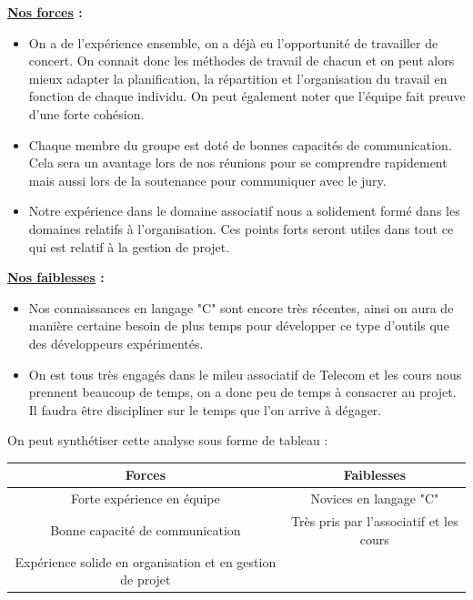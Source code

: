 \documentclass[a4paper, 12pt]{report}
\begin{document}
\textbf{\underline{Nos forces} :}
\begin{itemize}
    \item On a de l’expérience ensemble, on a déjà eu l'opportunité de travailler de concert. On connait donc les méthodes de travail de chacun et on peut alors mieux adapter la planification, la répartition et l'organisation du travail en fonction de chaque individu. On peut également noter que l'équipe fait preuve d'une forte cohésion.
    \item Chaque membre du groupe est doté de bonnes capacités de communication. Cela sera un avantage lors de nos réunions pour se comprendre rapidement mais aussi lors de la soutenance pour  communiquer avec le jury.
    \item Notre expérience dans le domaine associatif nous a solidement formé dans les domaines relatifs à l'organisation. Ces points forts seront utiles dans tout ce qui est relatif à la gestion de projet.
\end{itemize}
\bigskip

\textbf{\underline{Nos faiblesses} :}
\begin{itemize}
    \item Nos connaissances en langage "C" sont encore très récentes, ainsi on aura de manière certaine besoin de plus temps pour développer ce type d'outils que des développeurs expérimentés.
    \item On est tous très engagés dans le mileu associatif de Telecom et les cours nous prennent beaucoup de temps, on a donc peu de temps à consacrer au projet.  Il faudra être discipliner sur le temps que l'on arrive à dégager.
\end{itemize}
\clearpage

On peut synthétiser cette analyse sous forme de tableau :

\begin{table}[htbp]
    \centering\begin{tabular}{|c|c|}
        \hline
        \textcolor{mainColor}{Forces}                             & \textcolor{mainColor}{Faiblesses}       \\
        \hline\hline
        Forte expérience en équipe                                & Novices en langage "C"                  \\
        \hline
        Bonne capacité de communication                           & Très pris par l'associatif et les cours \\
        \hline
        Expérience solide en organisation et en gestion de projet &                                         \\
        \hline
    \end{tabular}
\end{table}
\end{document}
